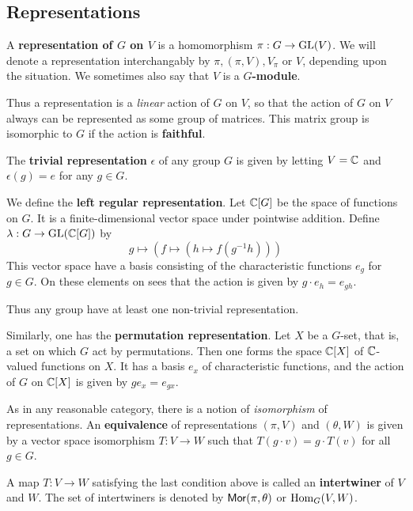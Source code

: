 \documentclass[11pt, english]{article}
\begin{document}
\subsection{Representations}

A \textbf{representation of $G$ on $V$} is a homomorphism $\pi:G \to \operatorname{GL}(V)$. We will denote a representation interchangably by $\pi, (\pi,V), V_\pi$ or $V$, depending upon the situation. We sometimes also say that $V$ is a \textbf{$G$-module}.

Thus a representation is a \emph{linear} action of $G$ on $V$, so that the action of $G$ on $V$ always can be represented as some group of matrices. This matrix group is isomorphic to $G$ if the action is \textbf{faithful}.

\begin{example}
  The \textbf{trivial representation} $\epsilon$ of any group $G$ is given by letting $V= \mathbb{C}$ and $\epsilon(g)=e$ for any $g \in G$.
\end{example}

\begin{example}
We define the \textbf{left regular representation}. Let $\mathbb{C}[G]$ be the space of functions on $G$. It is a finite-dimensional vector space under pointwise addition. Define $\lambda:G \to \operatorname{GL}(\mathbb{C}[G])$ by
\[
g \mapsto \left(f \mapsto (h \mapsto f(g^{-1}h)) \right)
\]
This vector space have a basis consisting of the characteristic functions $e_g$ for $g \in G$. On these elements on sees that the action is given by $g \cdot e_h = e_{gh}$. 

Thus any group have at least one non-trivial representation.
\end{example}

\begin{example}
Similarly, one has the \textbf{permutation representation}. Let $X$ be a $G$-set, that is, a set on which $G$ act by permutations. Then one forms the space $\mathbb{C}[X]$ of $\mathbb{C}$-valued functions on $X$. It has a basis $e_x$ of characteristic functions, and the action of $G$ on $\mathbb{C}[X]$ is given by $g e_x = e_{gx}$. 
\end{example}

As in any reasonable category, there is a notion of \emph{isomorphism} of representations. An \textbf{equivalence} of representations $(\pi,V)$ and $(\theta,W)$ is given by a vector space isomorphism $T:V \to W$ such that $T(g \cdot v) = g \cdot T(v)$ for all $g \in G$.

A map $T:V \to W$ satisfying the last condition above is called an \textbf{intertwiner} of $V$ and $W$. The set of intertwiners is denoted by $\mathsf{Mor}(\pi,\theta)$ or $\operatorname{Hom}_G(V,W)$.
\end{document}
